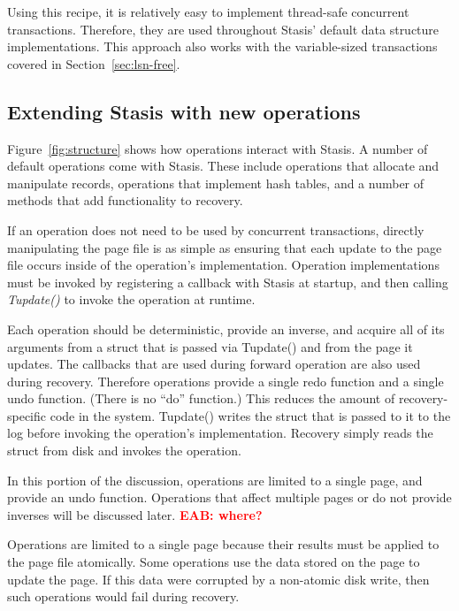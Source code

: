 \documentclass[letterpaper,twocolumn,10pt]{article}
\newcommand{\yad}{Stasis\xspace}
\newcommand{\yads}{Stasis'\xspace}
\newcommand{\eab}[1]{\textcolor{red}{\bf EAB: #1}}
\begin{document}
Using this recipe, it is relatively easy to implement thread-safe
concurrent transactions.  Therefore, they are used throughout \yads
default data structure implementations.  This approach also works with the variable-sized transactions covered in Section~\ref{sec:lsn-free}.





\subsection{Extending \yad with new operations}

Figure~\ref{fig:structure} shows how operations interact with \yad.  A
number of default operations come with \yad.  These include operations
that allocate and manipulate records, operations that implement hash
tables, and a number of methods that add functionality to recovery.

If an operation does not need to be used by concurrent
transactions, directly manipulating the page file is as simple as
ensuring that each update to the page file occurs inside of the
operation's implementation.  Operation implementations must be invoked
by registering a callback with \yad at startup, and then calling {\em
Tupdate()} to invoke the operation at runtime.  

Each operation should be deterministic, provide an inverse, and
acquire all of its arguments from a struct that is passed via
Tupdate() and from the page it updates.  The callbacks that are used
during forward operation are also used during recovery.  Therefore
operations provide a single redo function and a single undo function.
(There is no ``do'' function.)  This reduces the amount of
recovery-specific code in the system.  Tupdate() writes the struct
that is passed to it to the log before invoking the operation's
implementation.  Recovery simply reads the struct from disk and invokes the operation.

In this portion of the discussion, operations are limited to a single
page, and provide an undo function.  Operations that affect multiple
pages or do not provide inverses will be discussed later. \eab{where?}

Operations are limited to a single page because their results must be
applied to the page file atomically.  Some operations use the data
stored on the page to update the page.  If this data were corrupted by
a non-atomic disk write, then such operations would fail during recovery.
\end{document}
